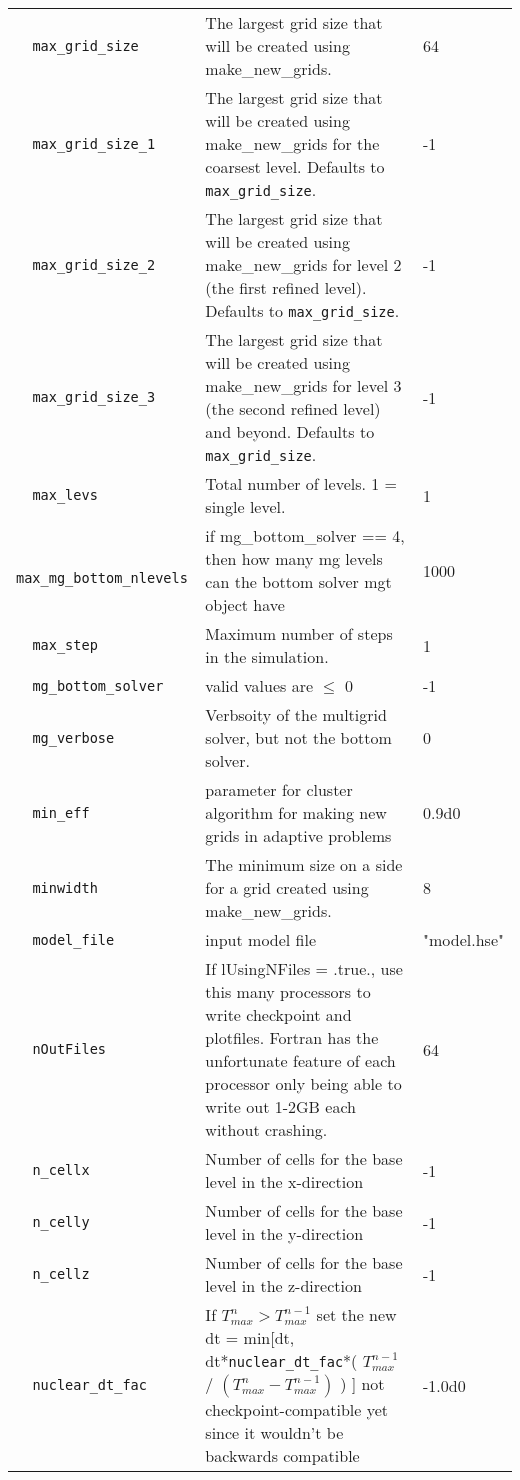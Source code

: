 {\begin{center}
\begin{longtable}{|l|p{3.25in}|l|}
\verb=  max_grid_size  = &   The largest grid size that will be created using make\_new\_grids.  &  64 \\
\verb=  max_grid_size_1  = &   The largest grid size that will be created using make\_new\_grids for the coarsest level.  Defaults to {\tt max\_grid\_size}.  &  -1 \\
\verb=  max_grid_size_2  = &   The largest grid size that will be created using make\_new\_grids for level 2 (the first refined level).  Defaults to {\tt max\_grid\_size}.  &  -1 \\
\verb=  max_grid_size_3  = &   The largest grid size that will be created using make\_new\_grids for level 3 (the second refined level) and beyond.  Defaults to {\tt max\_grid\_size}.  &  -1 \\
\verb=  max_levs  = &   Total number of levels.  1 = single level.  &  1 \\
\verb=  max_mg_bottom_nlevels  = &   if mg\_bottom\_solver == 4, then how many mg levels can the bottom solver mgt object have  &  1000 \\
\verb=  max_step  = &   Maximum number of steps in the simulation.  &  1 \\
\verb=  mg_bottom_solver  = &   valid values are $\le$ 0  &  -1 \\
\verb=  mg_verbose  = &   Verbsoity of the multigrid solver, but not the bottom solver.  &  0 \\
\verb=  min_eff  = &   parameter for cluster algorithm for making new grids in adaptive problems  &  0.9d0 \\
\verb=  minwidth  = &   The minimum size on a side for a grid created using make\_new\_grids.  &  8 \\
\verb=  model_file  = &   input model file  &  "model.hse" \\
\verb=  nOutFiles  = &   If lUsingNFiles = .true., use this many processors to write checkpoint and plotfiles.  Fortran has the unfortunate feature of each processor only being able to write out 1-2GB each without crashing.  &  64 \\
\verb=  n_cellx  = &   Number of cells for the base level in the x-direction  &  -1 \\
\verb=  n_celly  = &   Number of cells for the base level in the y-direction  &  -1 \\
\verb=  n_cellz  = &   Number of cells for the base level in the z-direction  &  -1 \\
\verb=  nuclear_dt_fac  = &   If $T_{max}^n > T_{max}^{n-1}$ set the new dt =   min[dt, dt*{\tt nuclear\_dt\_fac}*( $T_{max}^{n-1}$ / $(T_{max}^n-T_{max}^{n-1})$ ) ] not checkpoint-compatible yet since it wouldn't be backwards compatible  &  -1.0d0 \\

\end{longtable}
\end{center}}
